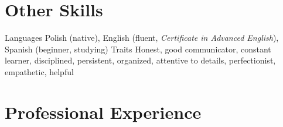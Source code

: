 \section{Other Skills}

\begin{sectionlist}
    \sectionlistitem
        {Languages}
        {
            Polish (native),
            English (fluent, \emph{Certificate in Advanced English}),
            Spanish (beginner, studying)
        }
    \sectionlistitem
        {Traits}
        {
            Honest, good communicator, constant learner, disciplined,
            persistent, organized, attentive to details, perfectionist,
            empathetic, helpful
        }
\end{sectionlist}


\section{Professional Experience}

